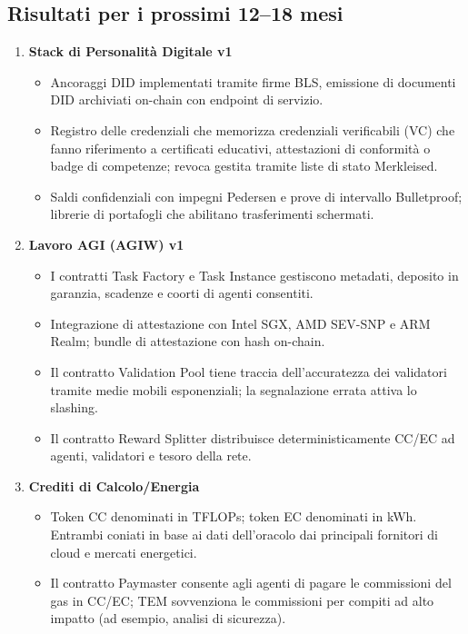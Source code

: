 \documentclass[11pt]{article}
\begin{document}
\subsection{Risultati per i prossimi 12--18 mesi}
\begin{enumerate}[label=\textbf{D\arabic*.}, leftmargin=*]
  \item \textbf{Stack di Personalità Digitale v1}
  \begin{itemize}[noitemsep]
    \item Ancoraggi DID implementati tramite firme BLS, emissione di documenti DID archiviati on-chain con endpoint di servizio.
    \item Registro delle credenziali che memorizza credenziali verificabili (VC) che fanno riferimento a certificati educativi, attestazioni di conformità o badge di competenze; revoca gestita tramite liste di stato Merkleised.
    \item Saldi confidenziali con impegni Pedersen e prove di intervallo Bulletproof; librerie di portafogli che abilitano trasferimenti schermati.
  \end{itemize}
  \item \textbf{Lavoro AGI (AGIW) v1}
  \begin{itemize}[noitemsep]
    \item I contratti Task Factory e Task Instance gestiscono metadati, deposito in garanzia, scadenze e coorti di agenti consentiti.
    \item Integrazione di attestazione con Intel SGX, AMD SEV-SNP e ARM Realm; bundle di attestazione con hash on-chain.
    \item Il contratto Validation Pool tiene traccia dell'accuratezza dei validatori tramite medie mobili esponenziali; la segnalazione errata attiva lo slashing.
    \item Il contratto Reward Splitter distribuisce deterministicamente CC/EC ad agenti, validatori e tesoro della rete.
  \end{itemize}
  \item \textbf{Crediti di Calcolo/Energia}
  \begin{itemize}[noitemsep]
    \item Token CC denominati in TFLOPs; token EC denominati in kWh. Entrambi coniati in base ai dati dell'oracolo dai principali fornitori di cloud e mercati energetici.
    \item Il contratto Paymaster consente agli agenti di pagare le commissioni del gas in CC/EC; TEM sovvenziona le commissioni per compiti ad alto impatto (ad esempio, analisi di sicurezza).

\end{itemize}
\end{enumerate}
\end{document}
